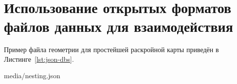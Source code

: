 
\section{
  Использование открытых форматов файлов данных для взаимодействия
}
\label{ch:json.files}

Пример файла геометрии для простейшей раскройной карты
приведён в Листинге~\ref{lst:json-dbs}.


    {media/nesting.json}
